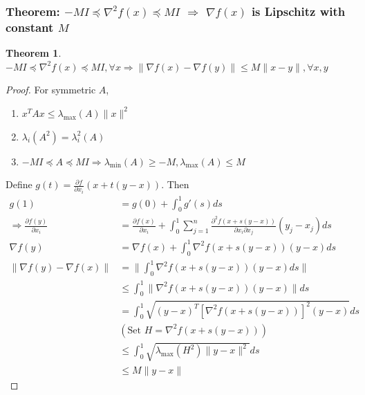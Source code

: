\documentclass[11pt,a4paper]{article}
\newtheorem{theorem}{Theorem}
\begin{document}
\subsubsection{Theorem: $-MI\preceq\nabla^2 f(x)\preceq  MI$ $\Rightarrow$ $\nabla f(x)$ is Lipschitz with constant $M$}
\begin{theorem}
$-MI\preceq\nabla^2 f(x)\preceq  MI, \forall x \Rightarrow \|\nabla f(x)-\nabla f(y)\|\leq M\|x-y\|,\forall x,y$
\end{theorem}
\begin{proof}
For symmetric $A$,
\begin{enumerate}
    \item $x^TAx\leq \lambda_{\max}(A)\|x\|^2$
    \item $\lambda_{i}(A^2)=\lambda_i^2(A)$
    \item $-MI\preceq A\preceq  MI \Rightarrow \lambda_{\min}(A)\geq-M,\lambda_{\max}(A)\leq M$
\end{enumerate}
Define $g(t)=\frac{\partial f}{\partial x_i}(x+t(y-x))$. Then
\begin{equation}
    \begin{aligned}
        g(1)&=g(0)+\int_0^1g'(s)ds\\
        \Rightarrow	\frac{\partial f(y)}{\partial x_i}&=\frac{\partial f(x)}{\partial x_i}+\int_0^1\sum_{j=1}^n \frac{\partial^2 f(x+s(y-x))}{\partial x_i\partial x_j}(y_j-x_j)ds\\
        \nabla f(y)&=\nabla f(x)+\int_0^1 \nabla^2 f(x+s(y-x))(y-x)ds\\
        \|\nabla f(y)-\nabla f(x)\|&=\|\int_0^1 \nabla^2 f(x+s(y-x))(y-x)ds\|\\
        &\leq \int_0^1\|\nabla^2 f(x+s(y-x))(y-x)\|ds\\
        &=\int_0^1\sqrt{(y-x)^T[\nabla^2 f(x+s(y-x))]^2(y-x)}ds\\
        &(\text{Set }H=\nabla^2 f(x+s(y-x)))\\
        &\leq \int_0^1\sqrt{\lambda_{\max}(H^2)\|y-x\|^2}ds\\
        &\leq M\|y-x\|
    \end{aligned}
    \nonumber
\end{equation}
\end{proof}
\end{document}
